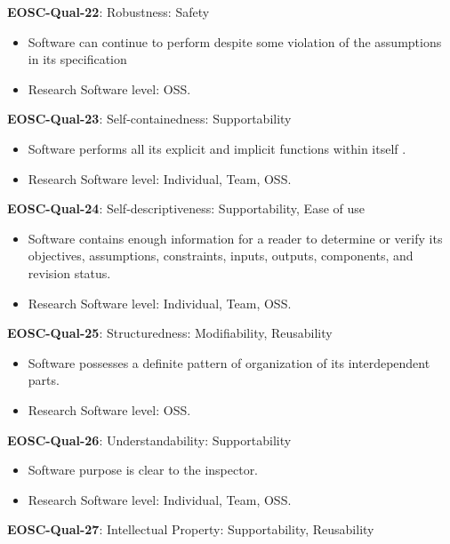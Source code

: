 \textbf{EOSC-Qual-22}: Robustness: Safety

\begin{itemize}
    \item Software can continue to perform despite some violation of the assumptions in its specification \cite{boehm_quantitative_1976}
    \item Research Software level: OSS.
\end{itemize}

\textbf{EOSC-Qual-23}: Self-containedness: Supportability

\begin{itemize}
    \item Software performs all its explicit and implicit functions within itself . \cite{boehm_quantitative_1976}
    \item Research Software level: Individual, Team, OSS.
\end{itemize}

\textbf{EOSC-Qual-24}: Self-descriptiveness: Supportability, Ease of use

\begin{itemize}
    \item Software contains enough information for a reader to determine or verify its objectives, assumptions, constraints, inputs, outputs, components, and revision status. \cite{boehm_quantitative_1976}
    \item Research Software level: Individual, Team, OSS.
\end{itemize}

\textbf{EOSC-Qual-25}: Structuredness: Modifiability, Reusability

\begin{itemize}
    \item Software possesses a definite pattern of organization of its interdependent parts. \cite{boehm_quantitative_1976}
    \item Research Software level: OSS.
\end{itemize}

\textbf{EOSC-Qual-26}: Understandability: Supportability

\begin{itemize}
    \item Software purpose is clear to the inspector. \cite{boehm_quantitative_1976}
    \item Research Software level: Individual, Team, OSS.
\end{itemize}

\textbf{EOSC-Qual-27}: Intellectual Property: Supportability, Reusability


